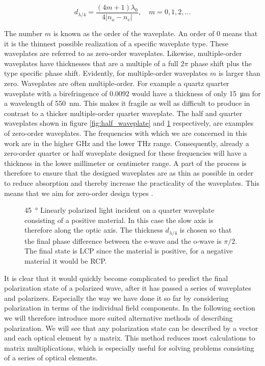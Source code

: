 \begin{equation}
    \label{eq:thickness_quarter_waveplate}
    d_{\lambda/4} = \frac{(4m+1)\lambda_0}{4|n_o - n_e|}, \quad m=0,1,2,... 
\end{equation}

The number $m$ is known as the order of the waveplate. An order of $0$ means that it is the thinnest possible realization of a specific waveplate type. These waveplates are referred to as zero-order waveplates. Likewise, multiple-order waveplates have thicknesses that are a multiple of a full $2\pi$ phase shift plus the type specific phase shift. Evidently, for multiple-order waveplates $m$ is larger than zero. Waveplates are often multiple-order. For example a quartz quarter waveplate with a birefringence of $0.0092$ would have a thickness of only \SI{15}{\micro \meter} for a wavelength of \SI{550}{\nano \meter}. This makes it fragile as well as difficult to produce in contrast to a thicker multiple-order quarter waveplate. The half and quarter waveplates shown in figure \ref{fig:half_waveplate} and \ref{fig:quarter_waveplate} respectively, are examples of zero-order waveplates. The frequencies with which we are concerned in this work are in the higher GHz and the lower THz range. Consequently, already a zero-order quarter or half waveplate designed for these frequencies will have a thickness in the lower millimeter or centimeter range. A part of the process is therefore to ensure that the designed waveplates are as thin as possible in order to reduce absorption and thereby increase the practicality of the waveplates. This means that we aim for zero-order design types \cite{HechtOpticsEdition}.

\begin{figure}[h]
    \centering
    
    \caption{\SI{45}{\degree} Linearly polarized light incident on a quarter waveplate consisting of a positive material. In this case the slow axis is therefore along the optic axis. The thickness $d_{\lambda/4}$ is chosen so that the final phase difference between the e-wave and the o-wave is $\pi/2$. The final state is LCP since the material is positive, for a negative material it would be RCP.}
    \label{fig:quarter_waveplate}
\end{figure}

It is clear that it would quickly become complicated to predict the final polarization state of a polarized wave, after it has passed a series of waveplates and polarizers. Especially the way we have done it so far by considering polarization in terms of the individual field components. In the following section we will therefore introduce more suited alternative methods of describing polarization. We will see that any polarization state can be described by a vector and each optical element by a matrix. This method reduces most calculations to matrix multiplications, which is especially useful for solving problems consisting of a series of optical elements.

